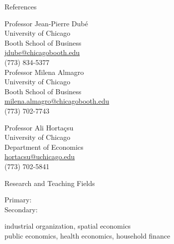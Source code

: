 \documentclass{resume} %
\begin{document}
	
	\begin{rSection}{References}	
		\begin{minipage}[t]{0.5\textwidth}
			Professor Jean-Pierre Dub\'e \\ %
			University of Chicago \\
			Booth School of Business \\
			\href{mailto:jdube@chicagobooth.edu}{jdube@chicagobooth.edu}\\
			(773) 834-5377 \\
			
			Professor Milena Almagro \\
			University of Chicago \\
			Booth School of Business \\
			\href{mailto:milena.almagro@chicagobooth.edu}{milena.almagro@chicagobooth.edu}\\
			(773) 702-7743
		\end{minipage}
		\begin{minipage}[t]{0.5\textwidth}
			Professor Ali Horta\c{c}su \\
			University of Chicago \\
			Department of Economics \\
			\href{mailto:hortacsu@uchicago.edu}{hortacsu@uchicago.edu}\\
			(773) 702-5841
		\end{minipage}
	\end{rSection}

	\begin{rSection}{Research and Teaching Fields}
		\begin{minipage}[t]{0.125\textwidth}
			Primary: \\
			Secondary:
		\end{minipage}
		\begin{minipage}[t]{0.875\textwidth}
			industrial organization, spatial economics \\
			public economics, health economics, household finance
		\end{minipage}
	\end{rSection}
\end{document}
